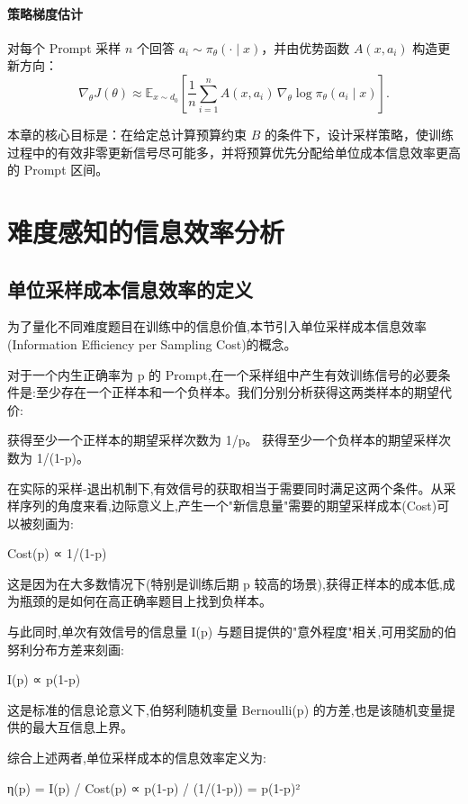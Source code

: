 {\paragraph{策略梯度估计}对每个 Prompt 采样 $n$ 个回答 $a_i\sim\pi_{\theta}(\cdot\mid x)$，并由优势函数 $A(x,a_i)$ 构造更新方向：
\begin{equation}
\label{eq:policy_grad_mc}
\nabla_{\theta}J(\theta)\approx \mathbb{E}_{x\sim d_0}\left[\frac{1}{n}\sum_{i=1}^{n} A(x,a_i)\,\nabla_{\theta}\log\pi_{\theta}(a_i\mid x)\right].
\end{equation}

本章的核心目标是：在给定总计算预算约束 $B$ 的条件下，设计采样策略，使训练过程中的有效非零更新信号尽可能多，并将预算优先分配给单位成本信息效率更高的 Prompt 区间。

\section{难度感知的信息效率分析}

\subsection{单位采样成本信息效率的定义}

为了量化不同难度题目在训练中的信息价值,本节引入单位采样成本信息效率(Information Efficiency per Sampling Cost)的概念。

对于一个内生正确率为 p 的 Prompt,在一个采样组中产生有效训练信号的必要条件是:至少存在一个正样本和一个负样本。我们分别分析获得这两类样本的期望代价:

获得至少一个正样本的期望采样次数为 1/p。
获得至少一个负样本的期望采样次数为 1/(1-p)。

在实际的采样-退出机制下,有效信号的获取相当于需要同时满足这两个条件。从采样序列的角度来看,边际意义上,产生一个"新信息量"需要的期望采样成本(Cost)可以被刻画为:

Cost(p) ∝ 1/(1-p)

这是因为在大多数情况下(特别是训练后期 p 较高的场景),获得正样本的成本低,成为瓶颈的是如何在高正确率题目上找到负样本。

与此同时,单次有效信号的信息量 I(p) 与题目提供的"意外程度"相关,可用奖励的伯努利分布方差来刻画:

I(p) ∝ p(1-p)

这是标准的信息论意义下,伯努利随机变量 Bernoulli(p) 的方差,也是该随机变量提供的最大互信息上界。

综合上述两者,单位采样成本的信息效率定义为:

η(p) = I(p) / Cost(p) ∝ p(1-p) / (1/(1-p)) = p(1-p)²

}
